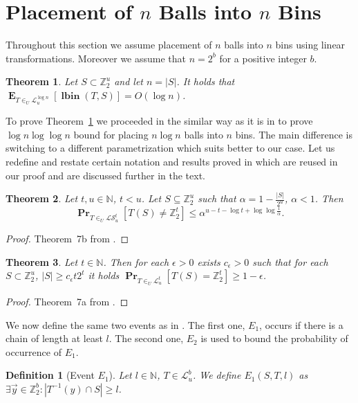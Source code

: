 \documentclass{article}
\newcommand{\lbin}[2]{\operatorname{\mathbf{lbin}}({#1}, {#2})}
\newcommand{\vecspace}[2]{\mathbb{Z}_{#1}^{#2}}
\newcommand{\binvecspace}[1]{\vecspace{2}{#1}}
\newcommand{\linearmaps}[2]{\mathcal{L}_{#1}^{#2}}
\newcommand{\surjectivelinearmaps}[2]{\mathcal{LS}_{#1}^{#2}}
\newcommand{\probs}[2]{\operatorname{\mathbf{Pr}}_{{#1}}\left[{#2}\right]}
\newcommand{\expects}[2]{\operatorname{\mathbf{E}}_{{#1}}\left[{#2}\right]}
\newtheorem{definition}{Definition}
\newtheorem{theorem}{Theorem}
\begin{document}
\section{Placement of $n$ Balls into $n$ Bins}

Throughout this section we assume placement of $n$ balls into $n$ bins using linear transformations.
Moreover we assume that $n = 2^b$ for a positive integer $b$.
\begin{theorem}
\label{theorem-n-to-n}
Let $S \subset \binvecspace{u}$ and let $n = |S|$. It holds that $\expects{T \in_U \linearmaps{u}{\log n}}{\lbin{T}{S}} = O(\log n)$.
\end{theorem}
To prove Theorem~\ref{theorem-n-to-n} we proceeded in the similar way as it is in \cite{alonetal} to prove $\log n \log \log n$ bound for placing $n \log n$ balls into $n$ bins. 
The main difference is switching to a different parametrization which suits better to our case.
Let us redefine and restate certain notation and results proved in \cite{alonetal} which are reused in our proof and are discussed further in the text.
\begin{theorem}
\label{theorem-prob-bound}
Let $t, u \in \mathbb{N}$, $t < u$.
Let $S \subseteq \binvecspace{u}$ such that $\alpha = 1 - \frac{|S|}{2^u}$, $\alpha < 1$.
Then 
\[
\probs{T \in_U \surjectivelinearmaps{u}{t}}{T(S) \neq \binvecspace{t}} \leq \alpha^{u - t - \log t + \log \log \frac{1}{\alpha}}.
\]
\end{theorem}
\begin{proof}
Theorem~{7b} from \cite{alonetal}.
\end{proof}

\begin{theorem}
\label{theorem-epsilon}
Let $t \in \mathbb{N}$.
Then for each $\epsilon > 0$ exists $c_\epsilon > 0$ such that for each $S \subset \binvecspace{u}$, $|S| \geq c_\epsilon t 2^t$ it holds  $\probs{T \in_U \linearmaps{u}{t}}{T(S) = \binvecspace{t}} \geq 1 - \epsilon$.
\end{theorem}
\begin{proof}
Theorem~{7a} from \cite{alonetal}.
\end{proof}

We now define the same two events as in \cite{alonetal}.
The first one, $E_1$, occurs if there is a chain of length at least $l$.
The second one, $E_2$ is used to bound the probability of occurrence of  $E_1$.
\begin{definition}[Event $E_1$]
Let $l \in \mathbb{N}$, $T \in \linearmaps{u}{b}$. We define $E_1(S, T, l)$ as $\exists \vec{y} \in \binvecspace{b} \colon |T^{-1}(y) \cap S| \geq l$.
\end{definition}
\end{document}
